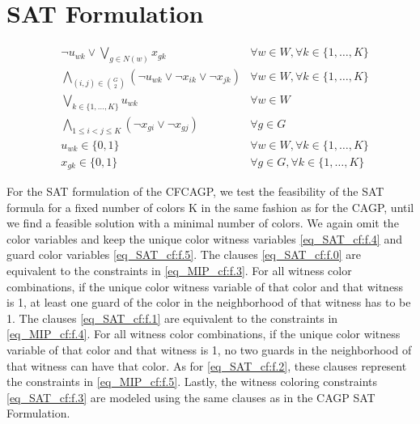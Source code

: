 \section{SAT Formulation}

\begin{align}
\label{eq_SAT_cf:f.0}&\lnot u_{wk} \lor \bigvee_{g \in N(w)}x_{gk} & \forall w \in W, \forall k\in \{1,\ldots,K\}\\
\label{eq_SAT_cf:f.1}&\bigwedge_{(i,j)\in {G\choose 2}} (\lnot u_{wk} \lor \lnot x_{ik} \lor \lnot x_{jk}) & \forall w \in W, \forall k\in \{1,\ldots,K\}\\
\label{eq_SAT_cf:f.2}&\bigvee_{k\in \{1,\ldots,K\}}u_{wk} & \forall w\in W\\
\label{eq_SAT_cf:f.3}&\bigwedge_{1 \leq i < j \leq K} (\lnot x_{gi} \lor \lnot x_{gj}) & \forall g\in G\\
\label{eq_SAT_cf:f.4}& u_{wk} \in \{0,1\} & \forall w\in W, \forall k\in \{1,\ldots,K\}\\
\label{eq_SAT_cf:f.5}& x_{gk} \in \{0,1\} & \forall g\in G, \forall k\in \{1,\ldots,K\}
\end{align}

For the SAT formulation of the CFCAGP, we test the feasibility of the SAT formula for a fixed number of colors K in the same fashion as for the CAGP, until we find a feasible solution with a minimal number of colors. We again omit the color variables and keep the unique color witness variables \cref{eq_SAT_cf:f.4} and guard color variables \cref{eq_SAT_cf:f.5}. The clauses \cref{eq_SAT_cf:f.0} are equivalent to the constraints in \cref{eq_MIP_cf:f.3}. For all witness color combinations, if the unique color witness variable of that color and that witness is 1, at least one guard of the color in the neighborhood of that witness has to be 1. The clauses \cref{eq_SAT_cf:f.1} are equivalent to the constraints in \cref{eq_MIP_cf:f.4}. For all witness color combinations, if the unique color witness variable of that color and that witness is 1, no two guards in the neighborhood of that witness can have that color. As for \cref{eq_SAT_cf:f.2}, these clauses represent the constraints in \cref{eq_MIP_cf:f.5}. Lastly, the witness coloring constraints \cref{eq_SAT_cf:f.3} are modeled using the same clauses as in the CAGP SAT Formulation.



